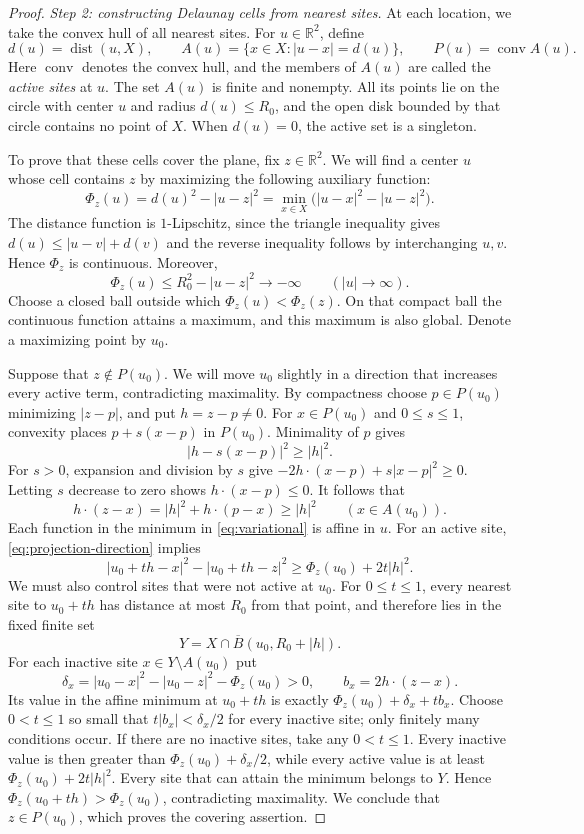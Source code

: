 \documentclass[11pt,a4paper]{article}
\theoremstyle{definition}
\theoremstyle{remark}
\newcommand{\R}{\mathbb{R}}
\DeclareMathOperator{\conv}{conv}
\DeclareMathOperator{\dist}{dist}
\begin{document}
\begin{proof}
\smallskip\noindent
\emph{Step 2: constructing Delaunay cells from nearest sites.}
At each location, we take the convex hull of all nearest sites. For
$u\in\R^2$, define
\[
d(u)=\dist(u,X),\qquad
A(u)=\{x\in X:|u-x|=d(u)\},\qquad
P(u)=\conv A(u).
\]
Here $\conv$ denotes the convex hull, and the members of $A(u)$ are
called the \emph{active sites} at $u$. The set $A(u)$ is finite and
nonempty. All its points lie on the circle
with center $u$ and radius $d(u)\leq R_0$, and the open disk bounded by
that circle contains no point of $X$. When $d(u)=0$, the active set is a
singleton.

To prove that these cells cover the plane, fix $z\in\R^2$. We will find
a center $u$ whose cell contains $z$ by maximizing the following
auxiliary function:
\begin{equation}
\label{eq:variational}
\Phi_z(u)=d(u)^2-|u-z|^2
=\min_{x\in X}\bigl(|u-x|^2-|u-z|^2\bigr).
\end{equation}
The distance function is $1$-Lipschitz, since the triangle inequality
gives $d(u)\leq |u-v|+d(v)$ and the reverse inequality follows by
interchanging $u,v$. Hence $\Phi_z$ is continuous. Moreover,
\[
\Phi_z(u)\leq R_0^2-|u-z|^2\longrightarrow-\infty
\qquad(|u|\to\infty).
\]
Choose a closed ball outside which $\Phi_z(u)<\Phi_z(z)$.
On that compact ball the continuous function attains a maximum, and
this maximum is also global. Denote a maximizing point by $u_0$.

Suppose that $z\notin P(u_0)$. We will move $u_0$ slightly in a direction
that increases every active term, contradicting maximality. By compactness choose
$p\in P(u_0)$ minimizing $|z-p|$, and put $h=z-p\ne0$.
For $x\in P(u_0)$ and $0\leq s\leq1$, convexity places
$p+s(x-p)$ in $P(u_0)$. Minimality of $p$ gives
\[
|h-s(x-p)|^2\geq |h|^2.
\]
For $s>0$, expansion and division by $s$ give
$-2h\cdot(x-p)+s|x-p|^2\geq0$. Letting $s$ decrease to zero shows
$h\cdot(x-p)\leq0$. It follows that
\begin{equation}
\label{eq:projection-direction}
h\cdot(z-x)=|h|^2+h\cdot(p-x)\geq|h|^2
\qquad(x\in A(u_0)).
\end{equation}
Each function in the minimum in \eqref{eq:variational} is affine in $u$.
For an active site, \eqref{eq:projection-direction} implies
\[
|u_0+th-x|^2-|u_0+th-z|^2
\geq\Phi_z(u_0)+2t|h|^2.
\]
We must also control sites that were not active at $u_0$. For
$0\leq t\leq1$, every nearest site to $u_0+th$ has distance
at most $R_0$ from that point, and therefore lies in the fixed finite set
\[
Y=X\cap\overline B(u_0,R_0+|h|).
\]
For each inactive site $x\in Y\setminus A(u_0)$ put
\[
\delta_x=|u_0-x|^2-|u_0-z|^2-\Phi_z(u_0)>0,
\qquad b_x=2h\cdot(z-x).
\]
Its value in the affine minimum at $u_0+th$ is exactly
$\Phi_z(u_0)+\delta_x+tb_x$. Choose $0<t\leq1$ so small that
$t|b_x|<\delta_x/2$ for every inactive site; only finitely many
conditions occur. If there are no inactive sites, take any $0<t\leq1$.
Every inactive value is then greater than
$\Phi_z(u_0)+\delta_x/2$, while every active value is at least
$\Phi_z(u_0)+2t|h|^2$. Every site that can attain the minimum belongs
to $Y$. Hence $\Phi_z(u_0+th)>\Phi_z(u_0)$, contradicting maximality.
We conclude that $z\in P(u_0)$, which proves the covering assertion.


\end{proof}
\end{document}
